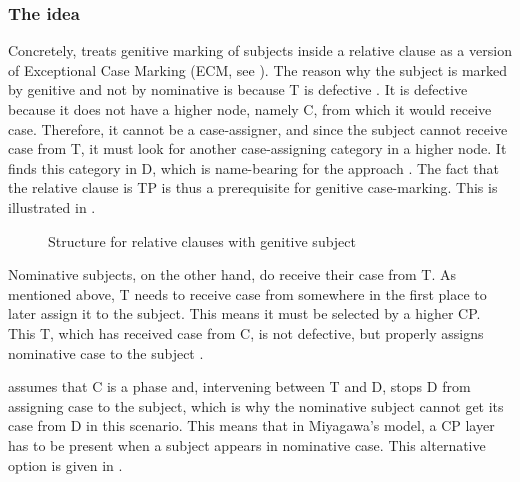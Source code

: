 \subsubsection{The idea}

Concretely, \citet{miyagawa:2011:genitive, miyagawa:2012:case, miyagawa:2017:agreement} treats genitive marking of subjects inside a relative clause as a version of Exceptional Case Marking (ECM, see \citealt{chomsky:1986:barriers, chomsky:2001:derivation}). The reason why the subject is marked by genitive and not by nominative is because T is defective \citep[1271]{miyagawa:2011:genitive}. It is defective because it does not have a higher node, namely C, from which it would receive case. Therefore, it cannot be a case-assigner, and since the subject cannot receive case from T, it must look for another case-assigning category in a higher node. It finds this category in D, which is name-bearing for the approach \citep[1271]{miyagawa:2011:genitive}. The fact that the relative clause is TP is thus a prerequisite for genitive case-marking. This is illustrated in .

\begin{figure}
\centering
{}
\caption{Structure for relative clauses with genitive subject \citep[147]{miyagawa:2017:agreement}}
\label{Rc with genitive miyagawa}
\end{figure}

Nominative subjects, on the other hand, do receive their case from T. As mentioned above, T needs to receive case from somewhere in the first place to later assign it to the subject. This means it must be selected by a higher CP. This T, which has received case from C, is not defective, but properly assigns nominative case to the subject \citep[1271]{miyagawa:2011:genitive}.

\citet[1271–1272]{miyagawa:2011:genitive} assumes that C is a phase and, intervening between T and D, stops D from assigning case to the subject, which is why the nominative subject cannot get its case from D in this scenario. This means that in Miyagawa's model, a CP layer has to be present when a subject appears in nominative case. This alternative option is given in .

